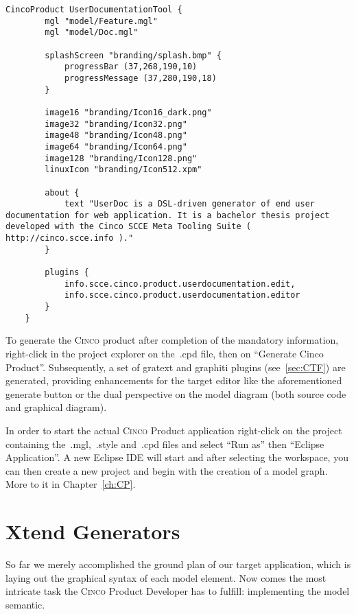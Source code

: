 \begin{lstlisting}[language=MGL, caption={UserDocumentationTool.cpd}]
    CincoProduct UserDocumentationTool {
        mgl "model/Feature.mgl"
        mgl "model/Doc.mgl"
        
        splashScreen "branding/splash.bmp" {
            progressBar (37,268,190,10)
            progressMessage (37,280,190,18)
        }
    
        image16 "branding/Icon16_dark.png"
        image32 "branding/Icon32.png"
        image48 "branding/Icon48.png"
        image64 "branding/Icon64.png"
        image128 "branding/Icon128.png"
        linuxIcon "branding/Icon512.xpm"
	
        about {
            text "UserDoc is a DSL-driven generator of end user documentation for web application. It is a bachelor thesis project developed with the Cinco SCCE Meta Tooling Suite ( http://cinco.scce.info )."
        }

        plugins {
            info.scce.cinco.product.userdocumentation.edit,
            info.scce.cinco.product.userdocumentation.editor
        }
    }
\end{lstlisting}

To generate the \textsc{Cinco} product after completion of the mandatory information, right-click in the project explorer on the~.cpd file, then on ``Generate Cinco Product''. Subsequently, a set of gratext and graphiti plugins (see~\ref{sec:CTF}) are generated, providing enhancements for the target editor like the aforementioned generate button or the dual perspective on the model diagram (both source code and graphical diagram). 

In order to start the actual \textsc{Cinco} Product application right-click on the project containing the~.mgl,~.style and~.cpd files and select ``Run as'' then ``Eclipse Application''. A new Eclipse IDE will start and after selecting the workspace, you can then create a new project and begin with the creation of a model graph. More to it in Chapter~\ref{ch:CP}.

\section{Xtend Generators}\label{sec:GEN}

So far we merely accomplished the ground plan of our target application, which is laying out the graphical syntax of each model element. Now comes the most intricate task the \textsc{Cinco} Product Developer has to fulfill: implementing the model semantic. 

